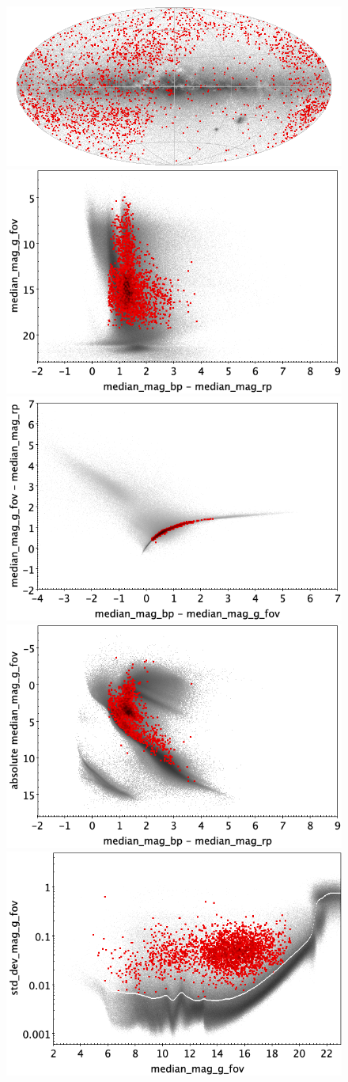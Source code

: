 \documentclass[longauth]{aa}
\begin{document}
\begin{appendix}
\begin{figure}
\centering
{} \includegraphics[width=0.6\hsize]{figures/appendix/RS_trn_sky.png} \\ %
\vspace{4mm}
 \includegraphics[width=0.45\hsize]{figures/appendix/RS_trn_cm.png}  %
\hspace{2mm}
 \includegraphics[width=0.45\hsize]{figures/appendix/RS_trn_cc.png} \\ %
\vspace{4mm}
 \includegraphics[width=0.45\hsize]{figures/appendix/RS_trn_cam.png}  %
\hspace{2mm}
 \includegraphics[width=0.45\hsize]{figures/appendix/RS_trn_msd.png} \\ %

\end{figure}
\end{appendix}
\end{document}
